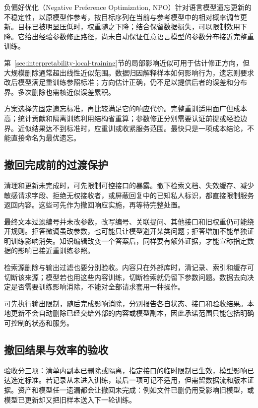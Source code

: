 负偏好优化（Negative Preference Optimization, NPO）针对语言模型遗忘更新的不稳定性，以原模型作参考，按目标序列在当前与参考模型中的相对概率调节更新。目标已被明显压低时，权重随之下降；结合保留数据损失，可以限制效用下降。它给出经验参数修正路径，尚未自动保证任意语言模型的参数分布接近完整重训练。

第~\ref{sec:interpretability-local-training}节的局部影响近似可用于估计修正方向，但大规模删除通常超出线性近似范围。数据归因解释样本如何影响行为，遗忘则要求改后模型满足重训练参照标准；方向估计正确，仍不足以提供后者的误差和分布界。多次删除也需核近似误差累积。

方案选择先固定遗忘标准，再比较满足它的响应代价。完整重训适用面广但成本高；统计贡献和隔离训练利用结构省重算；参数修正分别需要认证前提或经验边界。近似结果达不到标准时，应重训或收紧服务范围。最快只是一项成本结论，不能直接命名为最优遗忘。

\subsection{撤回完成前的过渡保护}
\label{sec:privacy-unlearning-output-control}

清理和更新未完成时，可先限制可控接口的暴露。撤下检索文档、失效缓存、减少敏感请求字段、拒绝无权接收者，或屏蔽回复中的已知私人标识，都直接限制服务返回内容。这些可先作为撤回响应实施，再等待完整处置。

最终文本过滤编号并未改参数，改写编号、关联提问、其他接口和旧权重仍可能绕开规则。拒答微调虽改参数，也可能只让模型避开某类问题；拒答增加不能单独证明训练影响消失。知识编辑改变一个答案后，同样要有额外证据，才能宣称指定数据的影响已接近重训练参照。

检索源删除与输出过滤也要分别验收。内容只在外部库时，清记录、索引和缓存可切断该来源；模型若也用这些内容训练，切断检索就仍留下参数问题。数据去向决定是否需要训练影响消除，不能对全部请求套用一种操作。

可先执行输出限制，随后完成影响消除，分别报告各自状态、接口和验收结果。本地更新不会自动删除已经交给外部的内容或模型副本，因此承诺范围只能包括明确可控制的状态和服务。

\subsection{撤回结果与效率的验收}
\label{sec:privacy-unlearning-validation}

验收分三项：清单内副本已删除或隔离，指定接口的临时限制已生效，模型影响已达选定标准。若记录从未进入训练，最后一项可记不适用，但需留数据流和版本证据。资产和模型任一遗漏都会让撤回未完成：例如文件已删仍用受影响旧模型，或模型已更新却又把旧样本送入下一轮训练。

